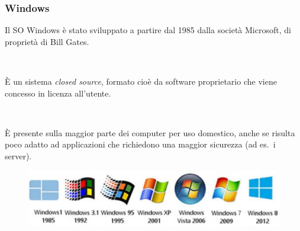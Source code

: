 \documentclass[handout]{beamer}
\begin{document}
\begin{frame}
\frametitle{Windows}
Il SO Windows è stato sviluppato a partire dal 1985 dalla società Microsoft, di proprietà di Bill Gates.\pause

~

È un sistema \emph{closed source}, formato cioè da \alert<2>{software proprietario} che viene concesso in licenza all'utente.\pause

~

È presente sulla maggior parte dei computer per uso domestico, anche se risulta poco adatto ad applicazioni che richiedono una maggior sicurezza (ad es.~i server).

\begin{figure}
  \includegraphics[width=.8\columnwidth]{img/windows.jpg}
\end{figure}
\end{frame}
\end{document}
